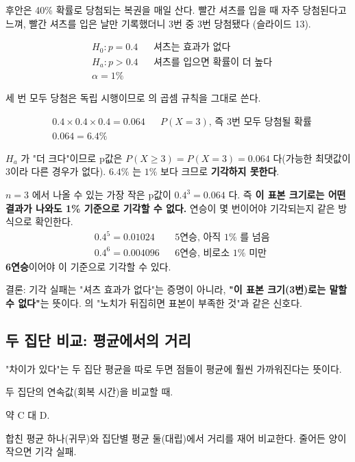 \begin{example}
\label{ex:ht-juan}
후안은 40\% 확률로 당첨되는 복권을 매일 산다. 빨간 셔츠를 입을 때 자주
당첨된다고 느껴, 빨간 셔츠를 입은 날만 기록했더니 3번 중 3번 당첨됐다
(슬라이드 13).

\begin{align*}
  &H_0: p = 0.4 && \text{셔츠는 효과가 없다}\\
  &H_a: p > 0.4 && \text{셔츠를 입으면 확률이 더 높다}\\
  &\alpha = 1\%
\end{align*}

세 번 모두 당첨은 독립 시행이므로 의 곱셈 규칙을
그대로 쓴다.

\begin{align*}
  &0.4 \times 0.4 \times 0.4 = 0.064 && \text{$P(X=3)$, 즉 3번 모두 당첨될 확률}\\
  &0.064 = 6.4\%
\end{align*}

$H_a$ 가 "더 크다"이므로 p값은 $P(X \ge 3) = P(X=3) = 0.064$ 다(가능한 최댓값이
3이라 다른 경우가 없다). $6.4\%$ 는 $1\%$ 보다 크므로 \textbf{기각하지
못한다}.

\begin{keyidea}
$n=3$ 에서 나올 수 있는 가장 작은 p값이 $0.4^3 = 0.064$ 다. 즉 \textbf{이
표본 크기로는 어떤 결과가 나와도 1\% 기준으로 기각할 수 없다.} 연승이 몇
번이어야 기각되는지 같은 방식으로 확인한다.
\begin{align*}
  &0.4^5 = 0.01024 && \text{5연승, 아직 $1\%$ 를 넘음}\\
  &0.4^6 = 0.004096 && \text{6연승, 비로소 $1\%$ 미만}
\end{align*}
\textbf{6연승}이어야 이 기준으로 기각할 수 있다.
\end{keyidea}

결론: 기각 실패는 "셔츠 효과가 없다"는 증명이 아니라, \textbf{"이 표본
크기(3번)로는 말할 수 없다"}는 뜻이다. 의 "노치가
뒤집히면 표본이 부족한 것"과 같은 신호다.
\end{example}

\subsection{두 집단 비교: 평균에서의 거리}
\label{sec:ht-two-groups}

\begin{inbrief}
  \item[Why] "차이가 있다"는 두 집단 평균을 따로 두면 점들이 평균에 훨씬
             가까워진다는 뜻이다.
  \item[When] 두 집단의 연속값(회복 시간)을 비교할 때.
  \item[Where] 약 C 대 D.
  \item[How] 합친 평균 하나(귀무)와 집단별 평균 둘(대립)에서 거리를 재어
             비교한다. 줄어든 양이 작으면 기각 실패.
\end{inbrief}


